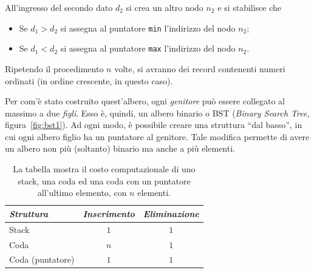 All'ingresso del secondo dato $d_2$ si crea un altro nodo $n_2$ e si stabilisce che
\begin{itemize}
	\item
Se $d_1>d_2$ si assegna al puntatore \lstinline!min! l'indirizzo del nodo $n_2$;
	\item
Se $d_1<d_2$ si assegna al puntatore \lstinline!max! l'indirizzo del nodo $n_2$.
\end{itemize}
Ripetendo il procedimento $n$ volte, si avranno dei record contenenti numeri ordinati (in ordine crescente, in questo caso).


Per com'è stato costruito quest'albero, ogni {\em genitore} può essere collegato al massimo a due \emph{figli}. Esso è, quindi, un albero binario o BST (\emph{Binary Search Tree}, figura~\vref{fig:bst1}). Ad ogni modo, è possibile creare una struttura ``dal basso'', in cui ogni albero figlio ha un puntatore al genitore. Tale modifica permette di avere un albero non più (soltanto) binario ma anche a più elementi.

\begin{table}
	\centering
	\caption[Costo computazionale]{La tabella mostra il costo computazionale di uno stack, una coda ed una coda con un puntatore all'ultimo elemento, con $n$ elementi.}
	\label{tab:co-st}
	\begin{tabular}{l | c c}
		\toprule
\emph{Struttura}		&\emph{Inserimento}	&\emph{Eliminazione}	\\
		\midrule
	Stack			&$1$				&$1$				\\
	Coda			&$n$				&$1$				\\
	Coda (puntatore)	&$1$				&$1$
	\end{tabular}
\end{table}

